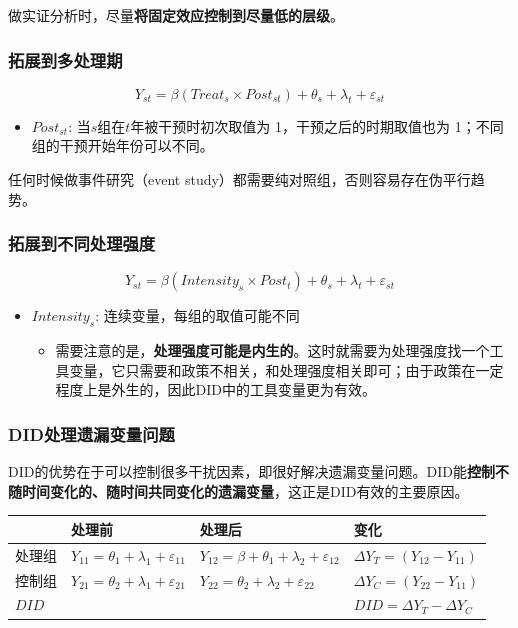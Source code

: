 \documentclass[11pt,a4paper]{ctexart}
\newcommand{\ve}{\varepsilon}
\begin{document}
做实证分析时，尽量\textbf{将固定效应控制到尽量低的层级}。

\subsubsection{拓展到多处理期}

\[Y_{st}=\beta(Treat_s\times Post_{st})+\theta_s+\lambda_t+\ve_{st}\]

\begin{itemize}
\item
  \(Post_{st}\): 当\(s\)组在\(t\)年被干预时初次取值为
  1，干预之后的时期取值也为 1；不同组的干预开始年份可以不同。
\end{itemize}

任何时候做事件研究（event
study）都需要纯对照组，否则容易存在伪平行趋势。

\subsubsection{拓展到不同处理强度}

\[Y_{st}=\beta(Intensity_s\times Post_{t})+\theta_s+\lambda_t+\ve_{st}\]

\begin{itemize}
\item
  \(Intensity_s\): 连续变量，每组的取值可能不同

  \begin{itemize}
  \item
    需要注意的是，\textbf{处理强度可能是内生的}。这时就需要为处理强度找一个工具变量，它只需要和政策不相关，和处理强度相关即可；由于政策在一定程度上是外生的，因此DID中的工具变量更为有效。
  \end{itemize}
\end{itemize}

\subsubsection{DID处理遗漏变量问题}

DID的优势在于可以控制很多干扰因素，即很好解决遗漏变量问题。DID能\textbf{控制不随时间变化的、随时间共同变化的遗漏变量}，这正是DID有效的主要原因。

\begin{longtable}[]{@{}llll@{}}
\toprule\noalign{}
& 处理前 & 处理后 & 变化 \\
\midrule\noalign{}
\endhead
\bottomrule\noalign{}
\endlastfoot
处理组 & \(Y_{11}=\theta_1+\lambda_1+\ve_{11}\) &
\(Y_{12}=\beta+\theta_1+\lambda_2+\ve_{12}\) &
\(\Delta Y_T=(Y_{12}-Y_{11})\) \\
控制组 & \(Y_{21}=\theta_2+\lambda_1+\ve_{21}\) &
\(Y_{22}=\theta_2+\lambda_2+\ve_{22}\) &
\(\Delta Y_C=(Y_{22}-Y_{11})\) \\
\(DID\) & & & \(DID=\Delta Y_T-\Delta Y_C\) \\
\end{longtable}
\end{document}
